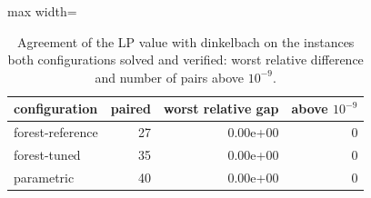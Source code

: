 \begin{table}[tbp]
\centering
\caption{Agreement of the LP value with dinkelbach on the instances both configurations solved and verified: worst relative difference and number of pairs above $10^{-9}$.}
\label{tab:agreement}
\small
\begin{adjustbox}{max width=\textwidth}
\begin{tabular}{lrrr}
\toprule
configuration & paired & worst relative gap & above $10^{-9}$ \\
\midrule
forest-reference & 27 & 0.00e+00 & 0 \\
forest-tuned & 35 & 0.00e+00 & 0 \\
parametric & 40 & 0.00e+00 & 0 \\
\bottomrule
\end{tabular}
\end{adjustbox}
\end{table}
